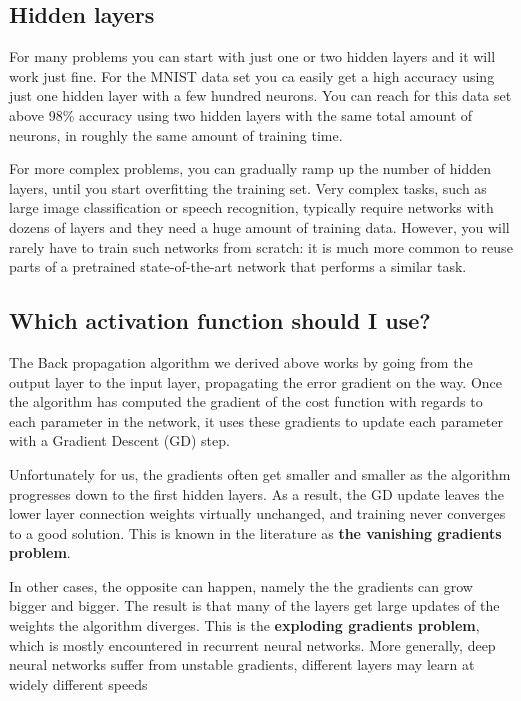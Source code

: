 \documentclass[%
oneside,                 %
final,                   %
10pt]{article}
\begin{document}
\noindent
\subsection{Hidden layers}

For many problems you can start with just one or two hidden layers and
it will work just fine.  For the MNIST data set you ca easily get a
high accuracy using just one hidden layer with a few hundred neurons.
You can reach for this data set above 98\% accuracy using two hidden
layers with the same total amount of neurons, in roughly the same
amount of training time.

For more complex problems, you can gradually ramp up the number of
hidden layers, until you start overfitting the training set. Very
complex tasks, such as large image classification or speech
recognition, typically require networks with dozens of layers and they
need a huge amount of training data. However, you will rarely have to
train such networks from scratch: it is much more common to reuse
parts of a pretrained state-of-the-art network that performs a similar
task.

\subsection{Which activation function should I use?}

The Back propagation algorithm we derived above works by going from
the output layer to the input layer, propagating the error gradient on
the way. Once the algorithm has computed the gradient of the cost
function with regards to each parameter in the network, it uses these
gradients to update each parameter with a Gradient Descent (GD) step.

Unfortunately for us, the gradients often get smaller and smaller as
the algorithm progresses down to the first hidden layers. As a result,
the GD update leaves the lower layer connection weights virtually
unchanged, and training never converges to a good solution. This is
known in the literature as \textbf{the vanishing gradients problem}.

In other cases, the opposite can happen, namely the the gradients can
grow bigger and bigger. The result is that many of the layers get
large updates of the weights the algorithm diverges. This is the
\textbf{exploding gradients problem}, which is mostly encountered in
recurrent neural networks. More generally, deep neural networks suffer
from unstable gradients, different layers may learn at widely
different speeds
\end{document}
